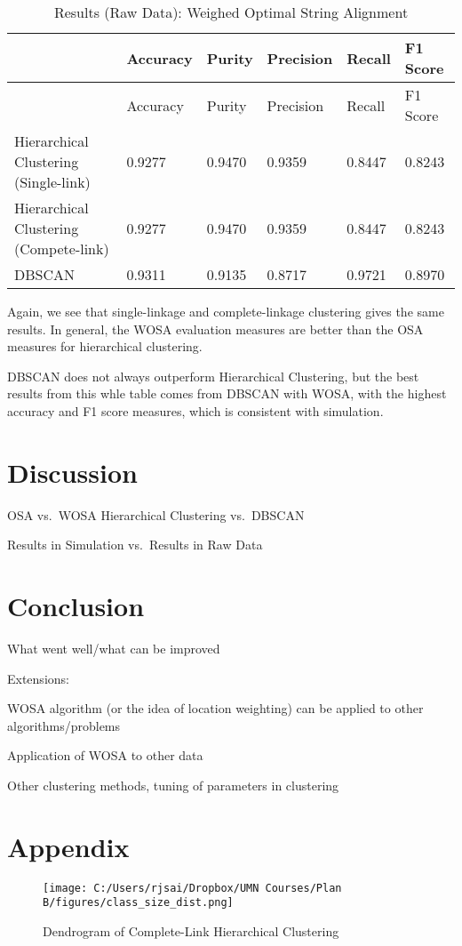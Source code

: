 \documentclass[]{article}
\begin{document}
\begin{longtable}[]{@{}llllll@{}}
\caption{Results (Raw Data): Weighed Optimal String
Alignment}\tabularnewline
\toprule
& Accuracy & Purity & Precision & Recall & F1 Score\tabularnewline
\midrule
\endfirsthead
\toprule
& Accuracy & Purity & Precision & Recall & F1 Score\tabularnewline
\midrule
\endhead
Hierarchical Clustering (Single-link) & 0.9277 & 0.9470 & 0.9359 &
0.8447 & 0.8243\tabularnewline
Hierarchical Clustering (Compete-link) & 0.9277 & 0.9470 & 0.9359 &
0.8447 & 0.8243\tabularnewline
DBSCAN & 0.9311 & 0.9135 & 0.8717 & 0.9721 & 0.8970\tabularnewline
\bottomrule
\end{longtable}

Again, we see that single-linkage and complete-linkage clustering gives
the same results. In general, the WOSA evaluation measures are better
than the OSA measures for hierarchical clustering.

DBSCAN does not always outperform Hierarchical Clustering, but the best
results from this whle table comes from DBSCAN with WOSA, with the
highest accuracy and F1 score measures, which is consistent with
simulation.

\section{Discussion}\label{discussion}

OSA vs.~WOSA Hierarchical Clustering vs.~DBSCAN

Results in Simulation vs.~Results in Raw Data

\section{Conclusion}\label{conclusion}

What went well/what can be improved

Extensions:

WOSA algorithm (or the idea of location weighting) can be applied to
other algorithms/problems

Application of WOSA to other data

Other clustering methods, tuning of parameters in clustering

\pagebreak

\section{Appendix}\label{appendix}

\begin{figure}
\centering
\texttt{[image: C:/Users/rjsai/Dropbox/UMN Courses/Plan B/figures/class\_size\_dist.png]}
\caption{Dendrogram of Complete-Link Hierarchical Clustering}
\end{figure}
\end{document}
